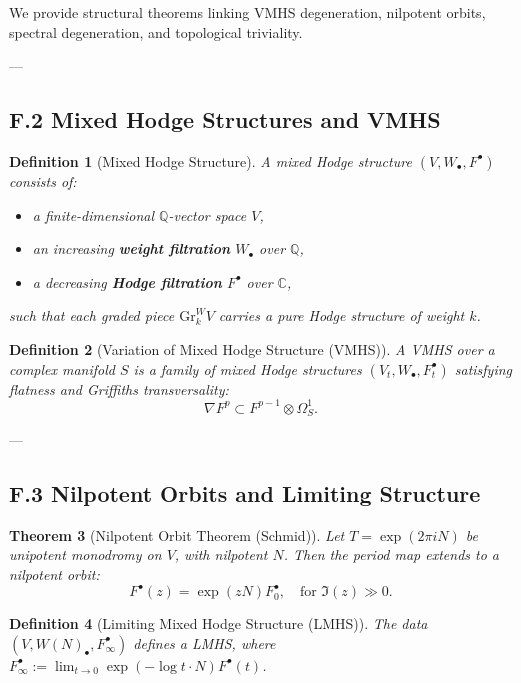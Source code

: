 \documentclass[11pt]{article}
\newtheorem{theorem}{Theorem}[section]
\newtheorem{definition}[theorem]{Definition}
\begin{document}
We provide structural theorems linking VMHS degeneration, nilpotent orbits, spectral degeneration, and topological triviality.

---

\subsection*{F.2 Mixed Hodge Structures and VMHS}

\begin{definition}[Mixed Hodge Structure]
A \emph{mixed Hodge structure} $(V, W_\bullet, F^\bullet)$ consists of:
\begin{itemize}
  \item a finite-dimensional $\mathbb{Q}$-vector space $V$,
  \item an increasing \textbf{weight filtration} $W_\bullet$ over $\mathbb{Q}$,
  \item a decreasing \textbf{Hodge filtration} $F^\bullet$ over $\mathbb{C}$,
\end{itemize}
such that each graded piece $\mathrm{Gr}_k^W V$ carries a pure Hodge structure of weight $k$.
\end{definition}

\begin{definition}[Variation of Mixed Hodge Structure (VMHS)]
A \emph{VMHS} over a complex manifold $S$ is a family of mixed Hodge structures $(V_t, W_\bullet, F_t^\bullet)$  
satisfying flatness and Griffiths transversality:
\[
\nabla F^p \subset F^{p-1} \otimes \Omega_S^1.
\]
\end{definition}

---

\subsection*{F.3 Nilpotent Orbits and Limiting Structure}

\begin{theorem}[Nilpotent Orbit Theorem (Schmid)]
Let $T = \exp(2\pi i N)$ be unipotent monodromy on $V$, with nilpotent $N$. Then the period map extends to a nilpotent orbit:
\[
F^\bullet(z) = \exp(z N) F^\bullet_0,
\quad \text{for } \Im(z) \gg 0.
\]
\end{theorem}

\begin{definition}[Limiting Mixed Hodge Structure (LMHS)]
The data $(V, W(N)_\bullet, F^\bullet_\infty)$ defines a LMHS,  
where $F^\bullet_\infty := \lim_{t \to 0} \exp(-\log t \cdot N) F^\bullet(t)$.
\end{definition}
\end{document}
